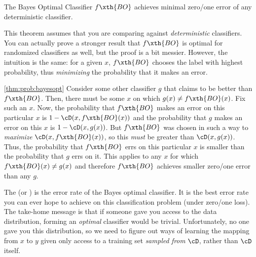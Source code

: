 \begin{theorem} \label{thm:prob:bayesopt}
  The Bayes Optimal Classifier $f\xth{BO}$ achieves minimal zero/one
  error of any deterministic classifier.
\end{theorem}

This theorem assumes that you are comparing against
\emph{deterministic} classifiers.  You can actually prove a stronger
result that $f\xth{BO}$ is optimal for randomized classifiers as well,
but the proof is a bit messier.  However, the intuition is the same:
for a given $x$, $f\xth{BO}$ chooses the label with highest
probability, thus \emph{minimizing} the probability that it makes an
error.

\begin{myproof}{\ref{thm:prob:bayesopt}}
  Consider some other classifier $g$ that claims to be better than
  $f\xth{BO}$.  Then, there must be some $x$ on which $g(x) \neq f\xth{BO}(x)$.  Fix
  such an $x$.  Now, the probability that $f\xth{BO}$ makes an error on this
  particular $x$ is $1 - \cD(x, f\xth{BO}(x))$ and the probability
  that $g$ makes an error on this $x$ is $1 - \cD(x, g(x))$.  But
  $f\xth{BO}$ was chosen in such a way to \emph{maximize} $\cD(x,
  f\xth{BO}(x))$, so this \emph{must} be greater than $\cD(x, g(x))$.
  Thus, the probability that $f\xth{BO}$ errs on this particular $x$ is
  smaller than the probability that $g$ errs on it.  This applies to
  any $x$ for which $f\xth{BO}(x) \neq g(x)$ and therefore $f\xth{BO}$ achieves
  smaller zero/one error than any $g$.
\end{myproof}

The  (or )
is the error rate of the Bayes optimal classifier.  It is the best
error rate you can ever hope to achieve on this classification problem
(under zero/one loss).
%
The take-home message is that if someone gave you access to the data
distribution, forming an \emph{optimal} classifier would be trivial.
Unfortunately, no one gave you this distribution, so we need to 
figure out ways of learning the mapping from $x$ to $y$ given only access to a training set \emph{sampled from} $\cD$, rather than $\cD$ itself.


